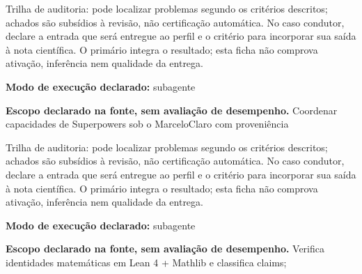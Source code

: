 \begin{funcao}
Trilha de auditoria: pode localizar problemas segundo os critérios descritos; achados são subsídios à revisão, não certificação automática. No caso condutor, declare a entrada que será entregue ao perfil e o critério para incorporar sua saída à nota científica. O primário integra o resultado; esta ficha não comprova ativação, inferência nem qualidade da entrega.
\end{funcao}

\begin{arquitetura}
\textbf{Modo de execução declarado:} subagente
\end{arquitetura}


\begin{descricao}
\textbf{Escopo declarado na fonte, sem avaliação de desempenho.}
Coordenar capacidades de Superpowers sob o MarceloClaro com proveniência
\end{descricao}

\begin{funcao}
Trilha de auditoria: pode localizar problemas segundo os critérios descritos; achados são subsídios à revisão, não certificação automática. No caso condutor, declare a entrada que será entregue ao perfil e o critério para incorporar sua saída à nota científica. O primário integra o resultado; esta ficha não comprova ativação, inferência nem qualidade da entrega.
\end{funcao}

\begin{arquitetura}
\textbf{Modo de execução declarado:} subagente
\end{arquitetura}


\begin{descricao}
\textbf{Escopo declarado na fonte, sem avaliação de desempenho.}
Verifica identidades matemáticas em Lean 4 + Mathlib e classifica claims;
\end{descricao}

